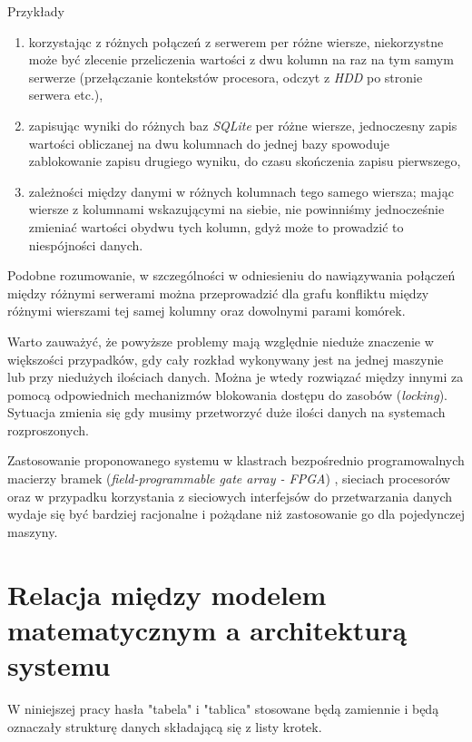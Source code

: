 \documentclass[brudnopis]{xmgr}
\begin{document}
Przykłady
\begin{enumerate}
    \item korzystając z różnych połączeń z serwerem per różne wiersze, niekorzystne może być zlecenie przeliczenia wartości z dwu kolumn na raz na tym samym serwerze (przełączanie kontekstów procesora, odczyt z \emph{HDD} po stronie serwera etc.),
    \item zapisując wyniki do różnych baz \emph{SQLite} per różne wiersze, jednoczesny zapis wartości obliczanej na dwu kolumnach do jednej bazy spowoduje zablokowanie zapisu drugiego wyniku, do czasu skończenia zapisu pierwszego,
    \item zależności między danymi w różnych kolumnach tego samego wiersza; mając wiersze z kolumnami wskazującymi na siebie, nie powinniśmy jednocześnie zmieniać wartości obydwu tych kolumn, gdyż może to prowadzić to niespójności danych.
\end{enumerate}
\medskip

Podobne rozumowanie, w szczególności w odniesieniu do nawiązywania połączeń między różnymi serwerami można przeprowadzić dla grafu konfliktu między różnymi wierszami tej samej kolumny oraz dowolnymi parami komórek.
\medskip

Warto zauważyć, że powyższe problemy mają względnie nieduże znaczenie w większości przypadków, gdy cały rozkład wykonywany jest na jednej maszynie lub przy niedużych ilościach danych. Można je wtedy rozwiązać między innymi za pomocą odpowiednich mechanizmów blokowania dostępu do zasobów (\emph{locking}).
Sytuacja zmienia się gdy musimy przetworzyć duże ilości danych na systemach rozproszonych.
\medskip

Zastosowanie proponowanego systemu w klastrach bezpośrednio programowalnych macierzy bramek (\emph{field-programmable gate array - FPGA}) \cite{sadrozinski2016applications}, sieciach procesorów oraz w przypadku korzystania z sieciowych interfejsów do przetwarzania danych wydaje się być bardziej racjonalne i pożądane niż zastosowanie go dla pojedynczej maszyny.



\chapter{Relacja między modelem matematycznym a architekturą systemu}

W niniejszej pracy hasła "tabela" i "tablica" stosowane będą zamiennie i będą oznaczały strukturę danych składającą się z listy krotek. 
\medskip
\end{document}
